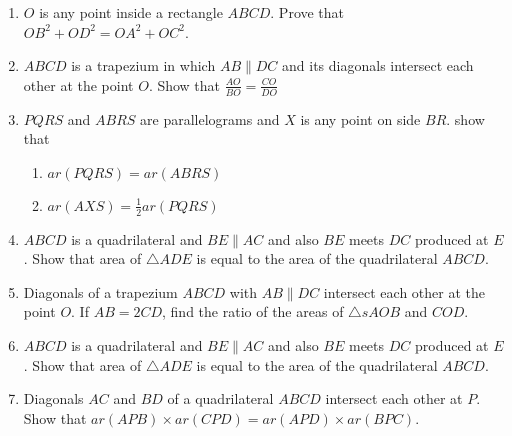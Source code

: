\begin{enumerate}[label=\thesubsection.\arabic*.,ref=\thesubsection.\theenumi]
%
\item $O$ is any point inside a rectangle $ABCD$. Prove that $OB^2+OD^2 = OA^2+OC^2$.
\item $ABCD$ is a trapezium in which $AB  \parallel  DC$ and its diagonals intersect each other at the point $O$. Show
that
$\frac{AO}{ BO}=\frac{CO}{  DO}$
%
\item $PQRS$ and $ABRS$ are parallelograms and $X$ is any point on side $BR$. show that 
\begin{enumerate} 
\item $ar (PQRS) = ar (ABRS)$
\item $ar (AX S) = \frac{1}{ 2} ar (PQRS)$
\end{enumerate}
\item $ABCD$ is a quadrilateral and $BE  \parallel  AC$ and also $BE$ meets $DC$ produced at $E$. Show that area of $ \triangle  ADE$ is equal to the area of the quadrilateral $ABCD$.
\item  Diagonals of a trapezium $ABCD$ with $AB  \parallel  DC$ intersect each other at the point $O$. If $AB = 2 CD$, find the ratio of the areas of $\triangle s AOB$ and $COD$.
\item $ABCD$ is a quadrilateral and $BE  \parallel  AC$ and also $BE$ meets $DC$ produced at $E$. Show that area of $ \triangle  ADE$ is equal to the area of the quadrilateral $ABCD$.
\item Diagonals $AC$ and $BD$ of a quadrilateral $ABCD$ intersect each other at $P$. Show that $ar (APB)  \times  ar (CPD) = ar (APD)  \times  ar (BPC)$.
\end{enumerate}
